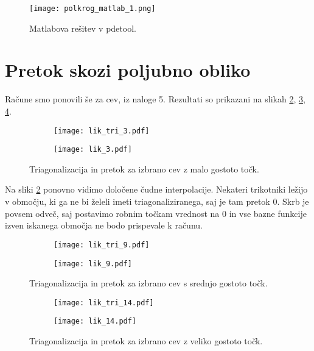 \documentclass[12pt,a4paper]{article}
\begin{document}
\begin{figure}[H]
\begin{center}
\texttt{[image: polkrog\_matlab\_1.png]}
\caption{Matlabova rešitev v \textsf{pdetool}.} \label{fig:slika10}
\end{center}
\end{figure} 

\section*{Pretok skozi poljubno obliko}

Račune smo ponovili še za cev, iz naloge 5. Rezultati so prikazani na slikah \ref{fig:slika11}, \ref{fig:slika12}, \ref{fig:slika13}.

\begin{figure}[H]
    \centering
    \begin{subfigure}[b]{0.45\textwidth}  			
        \texttt{[image: lik\_tri\_3.pdf]}
    \end{subfigure}
    \begin{subfigure}[b]{0.45\textwidth}
        \texttt{[image: lik\_3.pdf]}
    \end{subfigure}
    \caption{Triagonalizacija in pretok za izbrano cev z malo gostoto točk.} \label{fig:slika11}
\end{figure}

\noindent Na sliki \ref{fig:slika11} ponovno vidimo določene čudne interpolacije.
Nekateri trikotniki ležijo v območju, ki ga ne bi želeli imeti triagonaliziranega, saj je tam pretok 0. Skrb je povsem odveč, saj postavimo robnim točkam vrednost na 0 in vse bazne funkcije izven iskanega območja ne bodo prispevale k računu.


\begin{figure}[H]
    \centering
    \begin{subfigure}[b]{0.45\textwidth}  			
        \texttt{[image: lik\_tri\_9.pdf]}
    \end{subfigure}
    \begin{subfigure}[b]{0.45\textwidth}
        \texttt{[image: lik\_9.pdf]}
    \end{subfigure}
    \caption{Triagonalizacija in pretok za izbrano  cev s srednjo gostoto točk.} \label{fig:slika12}
\end{figure}

\begin{figure}[H]
    \centering
    \begin{subfigure}[b]{0.45\textwidth}  			
        \texttt{[image: lik\_tri\_14.pdf]}
    \end{subfigure}
    \begin{subfigure}[b]{0.45\textwidth}
        \texttt{[image: lik\_14.pdf]}
    \end{subfigure}
    \caption{Triagonalizacija in pretok za izbrano  cev z veliko gostoto točk.} \label{fig:slika13}
\end{figure}
\end{document}
